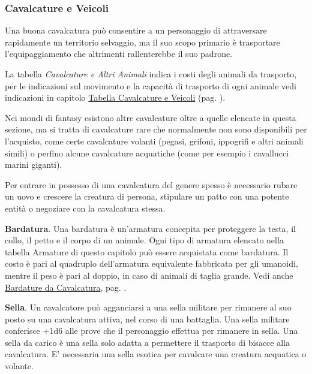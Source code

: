 \begin{multicols}{2}

\subsubsection{Cavalcature e Veicoli}

Una buona cavalcatura può consentire a un personaggio di attraversare rapidamente un territorio selvaggio, ma il suo scopo primario è trasportare l'equipaggiamento che altrimenti rallenterebbe il suo padrone.


La tabella \emph{Cavalcature e Altri Animali} indica i costi degli animali da trasporto, per le indicazioni sul movimento e la capacità di trasporto di ogni animale vedi indicazioni in capitolo \hyperlink{tabella-cavalcature-e-veicoli}{Tabella Cavalcature e Veicoli} (pag. \pageref{tabella-cavalcature-e-veicoli}).

Nei mondi di fantasy esistono altre cavalcature oltre a quelle elencate in questa sezione, ma si tratta di cavalcature rare che normalmente non sono disponibili per l'acquisto, come certe cavalcature volanti (pegasi, grifoni, ippogrifi e altri animali simili) o perfino alcune cavalcature acquatiche (come per esempio i cavallucci marini giganti).

Per entrare in possesso di una cavalcatura del genere spesso è necessario rubare un uovo e crescere la creatura di persona, stipulare un patto con una potente entità o negoziare con la cavalcatura stessa.

\textbf{Bardatura}. Una bardatura è un'armatura concepita per proteggere la testa, il collo, il petto e il corpo di un animale. Ogni tipo di armatura elencato nella tabella Armature di questo capitolo può essere acquistata come bardatura. Il costo è pari al quadruplo dell'armatura equivalente fabbricata per gli umanoidi, mentre il peso è pari al doppio, in caso di animali di taglia grande. Vedi anche \hyperlink{ArmaturedaCavallo}{Bardature da Cavalcatura}, pag. \pageref{ArmaturedaCavallo}.

\textbf{Sella}\hypertarget{Sella}{}. Un cavalcatore può agganciarsi a una sella militare per rimanere al suo posto su una cavalcatura attiva, nel corso di una battaglia. Una sella militare conferisce +1d6 alle prove che il personaggio effettua per rimanere in sella. Una sella da carico è una sella solo adatta a permettere il trasporto di bisacce alla cavalcatura. E' necessaria una sella esotica per cavalcare una creatura acquatica o volante.


\end{multicols}

